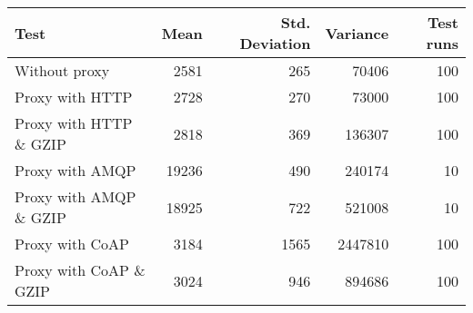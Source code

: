 \begin{tabular}{lrrrr}
\hline
 Test                   &   Mean &   Std. Deviation &   Variance &   Test runs \\
\hline
 Without proxy          &   2581 &              265 &      70406 &         100 \\
 Proxy with HTTP        &   2728 &              270 &      73000 &         100 \\
 Proxy with HTTP \& GZIP &   2818 &              369 &     136307 &         100 \\
 Proxy with AMQP        &  19236 &              490 &     240174 &          10 \\
 Proxy with AMQP \& GZIP &  18925 &              722 &     521008 &          10 \\
 Proxy with CoAP        &   3184 &             1565 &    2447810 &         100 \\
 Proxy with CoAP \& GZIP &   3024 &              946 &     894686 &         100 \\
\hline
\end{tabular}